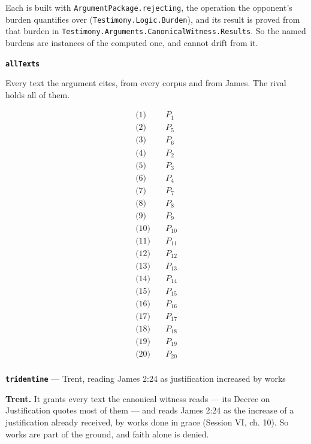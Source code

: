 \documentclass[11pt]{article}
\begin{document}
Each is built with \texttt{Argument\allowbreak{}Package.rejecting}, the operation the opponent's burden quantifies over (\texttt{Testimony.Logic.Burden}), and its result is proved from that burden in \texttt{Testimony.Arguments.Canonical\allowbreak{}Witness.Results}. So the named burdens are instances of the computed one, and cannot drift from it.

\par\medskip\noindent\textbf{\texttt{all\allowbreak{}Texts}}\par\nobreak\noindent
Every text the argument cites, from every corpus and from James. The rival holds all of them.

\begin{align*}
  \text{(1)} \quad & P_{1} \\
  \text{(2)} \quad & P_{5} \\
  \text{(3)} \quad & P_{6} \\
  \text{(4)} \quad & P_{2} \\
  \text{(5)} \quad & P_{3} \\
  \text{(6)} \quad & P_{4} \\
  \text{(7)} \quad & P_{7} \\
  \text{(8)} \quad & P_{8} \\
  \text{(9)} \quad & P_{9} \\
  \text{(10)} \quad & P_{10} \\
  \text{(11)} \quad & P_{11} \\
  \text{(12)} \quad & P_{12} \\
  \text{(13)} \quad & P_{13} \\
  \text{(14)} \quad & P_{14} \\
  \text{(15)} \quad & P_{15} \\
  \text{(16)} \quad & P_{16} \\
  \text{(17)} \quad & P_{17} \\
  \text{(18)} \quad & P_{18} \\
  \text{(19)} \quad & P_{19} \\
  \text{(20)} \quad & P_{20} \\
\end{align*}
\par\medskip\noindent\textbf{\texttt{tridentine}} --- Trent, reading James 2:24 as justification increased by works\par\nobreak\noindent
\textbf{Trent.} It grants every text the canonical witness reads — its Decree on Justification quotes most of them — and reads James 2:24 as the increase of a justification already received, by works done in grace (Session VI, ch. 10). So works are part of the ground, and faith alone is denied.
\end{document}
